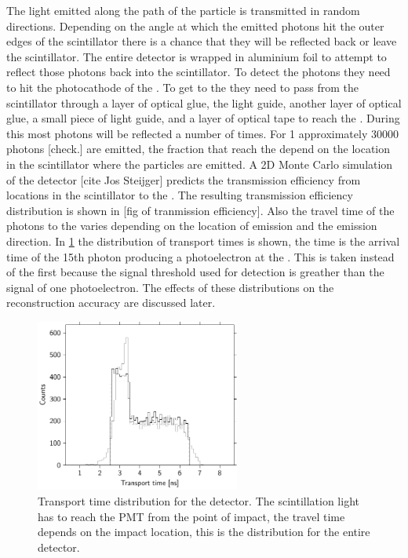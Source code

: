 The light emitted along the path of the particle is transmitted in random directions. Depending on the angle at which the emitted photons hit the outer edges of the scintillator there is a chance that they will be reflected back or leave the scintillator. The entire detector is wrapped in aluminium foil to attempt to reflect those photons back into the scintillator. To detect the photons they need to hit the photocathode of the \pmt. To get to the \pmt they need to pass from the scintillator through a layer of optical glue, the light guide, another layer of optical glue, a small piece of light guide, and a layer of optical tape to reach the \pmt. During this most photons will be reflected a number of times. For \SI{1}{\mip} approximately 30000 photons [check.] are emitted, the fraction that reach the \pmt depend on the location in the scintillator where the particles are emitted. A 2D Monte Carlo simulation of the detector [cite Jos Steijger] predicts the transmission efficiency from locations in the scintillator to the \pmt. The resulting transmission efficiency distribution is shown in [fig of tranmission efficiency]. Also the travel time of the photons to the \pmt varies depending on the location of emission and the emission direction. In \cref{fig:transport_time} the distribution of transport times is shown, the time is the arrival time of the 15th photon producing a photoelectron at the \pmt. This is taken instead of the first because the signal threshold used for detection is greather than the signal of one photoelectron. The effects of these distributions on the reconstruction accuracy are discussed later.

\begin{figure}
    \centering
    \includegraphics[width=0.6\textwidth]
                    {plots/experiment/transport_time}
    \caption{Transport time distribution for the detector. The scintillation light has to reach the PMT from the point of impact, the travel time depends on the impact location, this is the distribution for the entire detector.}
    \label{fig:transport_time}
\end{figure}


